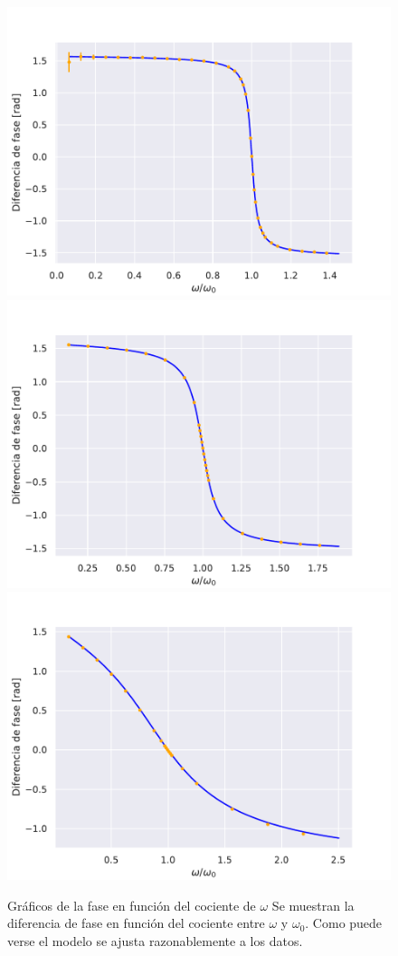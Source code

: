 \begin{figure} [H]
    \centering
    \includegraphics[scale=0.5]{figuras/RLC-SERIE-1/fase.pdf}
    \includegraphics[scale=0.5]{figuras/RLC-SERIE-2/fase.pdf}
    \includegraphics[scale=0.5]{figuras/RLC-SERIE-3/fase.pdf}
    \caption{Gráficos de la fase en función del cociente de $\omega$ Se muestran la diferencia de fase en función del cociente entre $\omega$ y $\omega_0$. Como puede verse el modelo se ajusta razonablemente a los datos.}
    \label{fig:fase_serie}
\end{figure}
